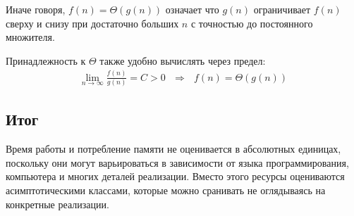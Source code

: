 Иначе говоря, $f(n)=\Theta(g(n))$ означает что $g(n)$ ограничивает $f(n)$ сверху и снизу при достаточно больших $n$ с точностью до постоянного множителя.

Принадлежность к $\Theta$ также удобно вычислять через предел:
$$
\begin{gathered}
\lim_{n\to\infty} \frac{f(n)}{g(n)} = C > 0   ~~~\Rightarrow~~~   f(n) = \Theta(g(n))
\end{gathered}
$$

\subsection*{Итог}

Время работы и потребление памяти не оценивается в абсолютных единицах, поскольку они могут варьироваться в зависимости от языка программирования, компьютера и многих деталей реализации. Вместо этого ресурсы оцениваются асимптотическими классами, которые можно сранивать не оглядываясь на конкретные реализации.
